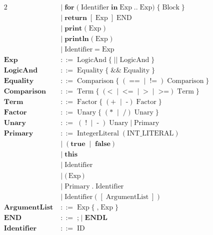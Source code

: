 \documentclass[a4paper,10pt]{article}
\begin{document}
\begin{alignat*}{2}
  \;&\mid\; \textbf{for}\;\textbf{(}\; \text{Identifier}\;\textbf{in}\;\text{Exp}
     \;\textbf{..}\;\text{Exp} \textbf{)}\; \{ \; \text{Block} \; \} \\[3pt]
  \;&\mid\; \textbf{return}\;[\;\text{Exp}\;]\;\text{END} \\[3pt]
  \;&\mid\; \textbf{print}\; \textbf{(} \; \text{Exp} \; \textbf{)} \\[3pt]
  \;&\mid\; \textbf{println}\; \textbf{(} \; \text{Exp} \; \textbf{)} \\[3pt]
  \;&\mid\; \text{Identifier}\;\textbf{=}\;\text{Exp}\\[3pt]
\textbf{Exp}
  \;&::=\; \text{LogicAnd} \;\{\; \textbf{||}\;\text{LogicAnd} \;\} \\[3pt]
\textbf{LogicAnd}
  \;&::=\; \text{Equality} \;\{\; \textbf{\&\&}\;\text{Equality} \;\} \\[3pt]
\textbf{Equality}
  \;&::=\; \text{Comparison} \; \{ \; ( \; \textbf{==}\;\mid\;\textbf{!=}\;)\;\text{Comparison} \; \}   \\[3pt]
\textbf{Comparison}
  \;&::=\; \text{Term}\; \{\;(\textbf{<}\;\mid\;\textbf{<=}\;\mid\;\textbf{>}\;\mid\;\textbf{>=})\;\text{Term} \;\}\\[3pt]
\textbf{Term}
  \;&::=\; \text{Factor}\;\{ \;(\textbf{+}\;\mid\;\textbf{-})\;\text{Factor}\; \} \\[3pt]
\textbf{Factor}
  \;&::=\; \text{Unary}\;\{ \;(\textbf{*}\;\mid\;\textbf{/})\;\text{Unary}\; \} \\[3pt]
\textbf{Unary}
  \;&::=\; (\;\textbf{!}\;\mid\;\textbf{-}\;)\;\text{Unary}
   \;|\;\text{Primary} \\[3pt]
\textbf{Primary}
  \;&::=\; \text{IntegerLiteral}\;( \text{INT\_LITERAL} ) \\[2pt]
  \;&\mid\; ( \textbf{true}\;\mid\;\textbf{false} ) \\[2pt]
  \;&\mid\; \textbf{this} \\[2pt]
  \;&\mid\; \text{Identifier} \\[2pt]
  \;&\mid\; \textbf{(}\,\text{Exp}\,\textbf{)} \\[2pt]
  \;&\mid\; \text{Primary}\;\textbf{.}\;\text{Identifier} \\[2pt]
  \;&\mid\; \text{Identifier}\;\textbf{(} \; [\;\text{ArgumentList}\;]\; \textbf{)} \\[3pt]
\textbf{ArgumentList}
  \;&::=\; \text{Exp}\; \{ \;\textbf{,}\;\text{Exp} \; \} \\[3pt]
\textbf{END}
  \;&::=\; \textbf{;}\;|\;\textbf{ENDL} \\[3pt]
\textbf{Identifier}
  \;&::=\; \text{ID} \\[3pt]
\end{alignat*}
\end{document}
